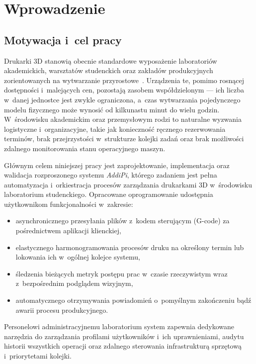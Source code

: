 \documentclass[a4paper,12pt,reqno]{article}
\begin{document}
\section{Wprowadzenie}
\label{sec:introduction}

\subsection{Motywacja i~cel pracy}

Drukarki 3D stanowią obecnie standardowe wyposażenie laboratoriów akademickich, warsztatów studenckich oraz zakładów produkcyjnych zorientowanych na wytwarzanie przyrostowe~\cite{gibson2021}. Urządzenia te, pomimo rosnącej dostępności i~malejących cen, pozostają zasobem współdzielonym --- ich liczba w~danej jednostce jest zwykle ograniczona, a~czas wytwarzania pojedynczego modelu fizycznego może wynosić od kilkunastu minut do wielu godzin. W~środowisku akademickim oraz przemysłowym rodzi to naturalne wyzwania logistyczne i~organizacyjne, takie jak konieczność ręcznego rezerwowania terminów, brak przejrzystości w~strukturze kolejki zadań oraz brak możliwości zdalnego monitorowania stanu operacyjnego maszyn.

Głównym celem niniejszej pracy jest zaprojektowanie, implementacja oraz walidacja rozproszonego systemu \textit{AddiPi}, którego zadaniem jest pełna automatyzacja i~orkiestracja procesów zarządzania drukarkami 3D w~środowisku laboratorium studenckiego. Opracowane oprogramowanie udostępnia użytkownikom funkcjonalności w~zakresie:
\begin{itemize}
	\item asynchronicznego przesyłania plików z~kodem sterującym (G-code) za pośrednictwem aplikacji klienckiej,
	\item elastycznego harmonogramowania procesów druku na określony termin lub lokowania ich w~ogólnej kolejce systemu,
	\item śledzenia bieżących metryk postępu prac w~czasie rzeczywistym wraz z~bezpośrednim podglądem wizyjnym,
	\item automatycznego otrzymywania powiadomień o~pomyślnym zakończeniu bądź awarii procesu produkcyjnego.
\end{itemize}

Personelowi administracyjnemu laboratorium system zapewnia dedykowane narzędzia do zarządzania profilami użytkowników i~ich uprawnieniami, audytu historii wszystkich operacji oraz zdalnego sterowania infrastrukturą sprzętową i~priorytetami kolejki.
\end{document}

